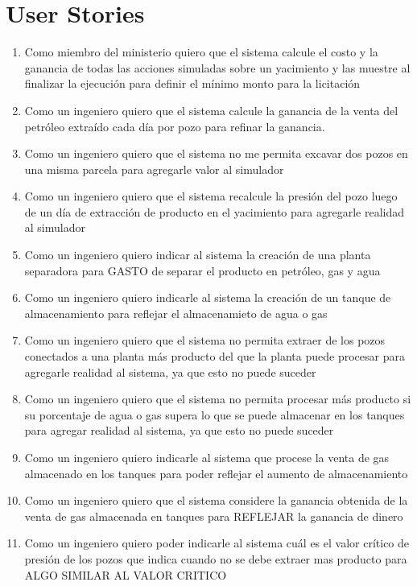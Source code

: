 \section{User Stories}

\begin{enumerate}
  \item Como miembro del ministerio quiero que el sistema calcule el costo y la ganancia de todas las acciones simuladas sobre un yacimiento y las muestre al finalizar la ejecución para definir el mínimo monto para la licitación
  \item Como un ingeniero quiero que el sistema calcule la ganancia de la venta del petróleo extraído cada día por pozo para refinar la ganancia.
  \item Como un ingeniero quiero que el sistema no me permita excavar dos pozos en una misma parcela para agregarle valor al simulador
  \item Como un ingeniero quiero que el sistema recalcule la presión del pozo luego de un día de extracción de producto en el yacimiento para agregarle realidad al simulador
  \item Como un ingeniero quiero indicar al sistema la creación de una planta separadora para GASTO de separar el producto en petróleo, gas y agua
  \item Como un ingeniero quiero indicarle al sistema la creación de un tanque de almacenamiento para reflejar el almacenamieto de agua o gas
  \item Como un ingeniero quiero que el sistema no permita extraer de los pozos conectados a una planta más producto del que la planta puede procesar para agregarle realidad al sistema, ya que esto no puede suceder
  \item Como un ingeniero quiero que el sistema no permita procesar más producto si su porcentaje de agua o gas supera lo que se puede almacenar en los tanques para agregar realidad al sistema, ya que esto no puede suceder
  \item Como un ingeniero quiero indicarle al sistema que procese la venta de gas almacenado en los tanques para poder reflejar el aumento de almacenamiento
  \item Como un ingeniero quiero que el sistema considere la ganancia obtenida de la venta de gas almacenada en tanques para REFLEJAR la ganancia de dinero
  \item Como un ingeniero quiero poder indicarle al sistema cuál es el valor crítico de presión de los pozos que indica cuando no se debe extraer mas producto para ALGO SIMILAR AL VALOR CRITICO

\end{enumerate}
